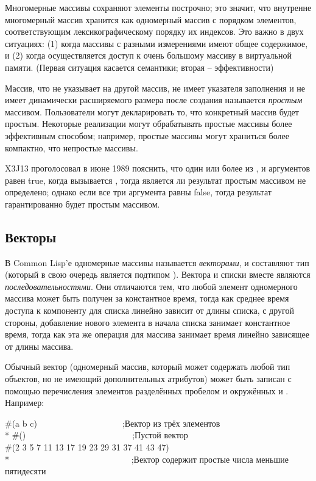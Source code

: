 Многомерные массивы сохраняют элементы построчно;
это значит, что внутренне многомерный массив хранится как одномерный массив с
порядком элементов, соответствующим лексикографическому порядку их индексов. Это
важно в двух ситуациях:
(1) когда массивы с разными измерениями имеют общее содержимое, и 
(2) когда осуществляется доступ к очень большому массиву в виртуальной памяти.
(Первая ситуация касается семантики; вторая -- эффективности)

Массив, что не указывает на другой массив, не имеет указателя заполнения и не
имеет динамически расширяемого размера после создания называется \emph{простым}
массивом. Пользователи могут декларировать то, что конкретный массив будет
простым. Некоторые реализации могут обрабатывать простые массивы более
эффективным способом; например, простые массивы могут храниться более компактно,
что непростые массивы. 

\begin{newer}
X3J13 проголосовал в июне 1989
пояснить, что один или более из ,  и
 аргументов равен true, когда вызывается ,
тогда является ли результат простым массивом не определено; однако если все три
аргумента равны false, тогда результат гарантированно будет простым массивом.
\end{newer}

\subsection{Векторы}

В Common Lisp'е одномерные массивы называется \emph{векторами}, и составляют тип
 (который в свою очередь является подтипом ).
Вектора и списки вместе являются \emph{последовательностями}. Они отличаются тем,
что любой элемент одномерного массива может быть получен за константное время,
тогда как среднее время доступа к компоненту для списка линейно зависит от длины
списка, с другой стороны, добавление нового элемента в начала списка занимает
константное время, тогда как эта же операция для массива занимает время линейно
зависящее от длины массива.

Обычный вектор (одномерный массив, который может содержать любой тип объектов,
но не имеющий дополнительных атрибутов) может быть записан с помощью
перечисления элементов разделённых пробелом и окружённых \cd{\#(} и
\cd{)}.
Например:
\begin{lisp}
\#(a b c)~~~~~~~~~~~~~~~~~~~~;\textrm{Вектор из трёх элементов} \\*
\#()~~~~~~~~~~~~~~~~~~~~~~~~~;\textrm{Пустой вектор} \\
\#(2 3 5 7 11 13 17 19 23 29 31 37 41 43 47) \\*
~~~~~~~~~~~~~~~~~~~~~~~~~~~~;\textrm{Вектор содержит простые числа меньшие пятидесяти}
\end{lisp}

